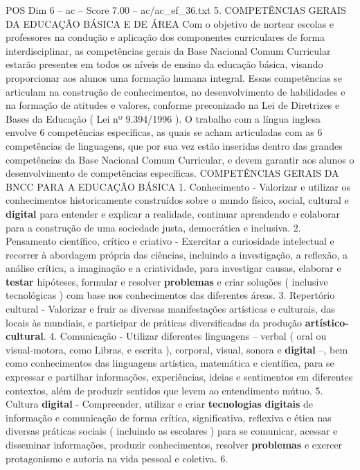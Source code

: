 \begin{textsample}{POS Dim 6 – ac – Score 7.00 – ac/ac\_ef\_36.txt}  \label{ex:f6_pos_158}
5.
COMPETÊNCIAS GERAIS DA EDUCAÇÃO BÁSICA E DE ÁREA Com o objetivo de nortear escolas e professores na condução e aplicação dos componentes curriculares de forma interdisciplinar, as competências gerais da Base Nacional Comum Curricular estarão presentes em todos os níveis de ensino da educação básica, visando proporcionar aos alunos uma formação humana integral.
Essas competências se articulam na construção de conhecimentos, no desenvolvimento de habilidades e na formação de atitudes e valores, conforme preconizado na Lei de Diretrizes e Bases da Educação ( Lei nº 9.394/1996 ).
O trabalho com a língua inglesa envolve 6 competências específicas, as quais se acham articuladas com as 6 competências de linguagens, que por sua vez estão inseridas dentro das grandes competências da Base Nacional Comum Curricular, e devem garantir aos alunos o desenvolvimento de competências específicas.
COMPETÊNCIAS GERAIS DA BNCC PARA A EDUCAÇÃO BÁSICA 1.
Conhecimento - Valorizar e utilizar os conhecimentos historicamente construídos sobre o mundo físico, social, cultural e \textbf{digital} para entender e explicar a realidade, continuar aprendendo e colaborar para a construção de uma sociedade justa, democrática e inclusiva. 2.
Pensamento científico, crítico e criativo - Exercitar a curiosidade intelectual e recorrer à abordagem própria das ciências, incluindo a investigação, a reflexão, a análise crítica, a imaginação e a criatividade, para investigar causas, elaborar e \textbf{testar} hipóteses, formular e resolver \textbf{problemas} e criar soluções ( inclusive tecnológicas ) com base nos conhecimentos das diferentes áreas. 3.
Repertório cultural - Valorizar e fruir as diversas manifestações artísticas e culturais, das locais às mundiais, e participar de práticas diversificadas da produção \textbf{artístico-cultural}. 4.
Comunicação - Utilizar diferentes linguagens – verbal ( oral ou visual-motora, como Libras, e escrita ), corporal, visual, sonora e \textbf{digital} –, bem como conhecimentos das linguagens artística, matemática e científica, para se expressar e partilhar informações, experiências, ideias e sentimentos em diferentes contextos, além de produzir sentidos que levem ao entendimento mútuo. 5.
Cultura \textbf{digital} - Compreender, utilizar e criar \textbf{tecnologias} \textbf{digitais} de informação e comunicação de forma crítica, significativa, reflexiva e ética nas diversas práticas sociais ( incluindo as escolares ) para se comunicar, acessar e disseminar informações, produzir conhecimentos, resolver \textbf{problemas} e exercer protagonismo e autoria na vida pessoal e coletiva. 6.

\end{textsample}
